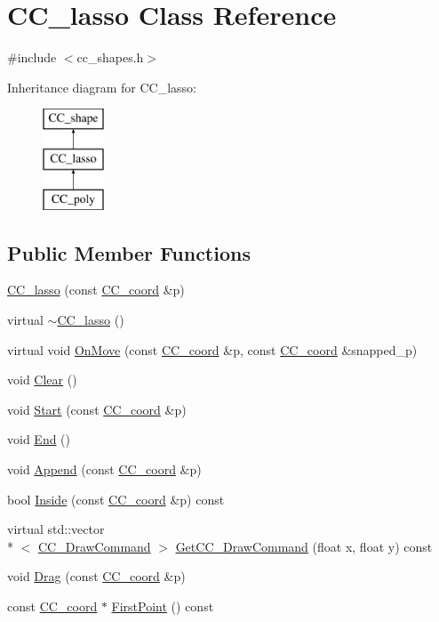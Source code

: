 \hypertarget{a00033}{\section{C\-C\-\_\-lasso Class Reference}
\label{a00033}
}


{\ttfamily \#include $<$cc\-\_\-shapes.\-h$>$}

Inheritance diagram for C\-C\-\_\-lasso\-:\begin{figure}[H]
\begin{center}
\leavevmode
\includegraphics[height=3.000000cm]{a00033}
\end{center}
\end{figure}
\subsection*{Public Member Functions}
\begin{DoxyCompactItemize}
\item 
\hyperlink{a00033_a52c0140bc457076fd9d0126d3dc1c8ad}{C\-C\-\_\-lasso} (const \hyperlink{a00029}{C\-C\-\_\-coord} \&p)
\item 
virtual \hyperlink{a00033_a20774b6bda8264fe9e229a0bbf9854f7}{$\sim$\-C\-C\-\_\-lasso} ()
\item 
virtual void \hyperlink{a00033_ae5572606390286f5b6a2f137aee93dc9}{On\-Move} (const \hyperlink{a00029}{C\-C\-\_\-coord} \&p, const \hyperlink{a00029}{C\-C\-\_\-coord} \&snapped\-\_\-p)
\item 
void \hyperlink{a00033_afe2140061e67412e38f86c13226c33b5}{Clear} ()
\item 
void \hyperlink{a00033_a69c7a48f5b32a35407dafdcabd62cc1d}{Start} (const \hyperlink{a00029}{C\-C\-\_\-coord} \&p)
\item 
void \hyperlink{a00033_a86d2e800ef81566eb90d9d5819d7bcde}{End} ()
\item 
void \hyperlink{a00033_a8d6269272f544d58e85deb5fee9f04f4}{Append} (const \hyperlink{a00029}{C\-C\-\_\-coord} \&p)
\item 
bool \hyperlink{a00033_a6cdc0697c525220754dd53777587ea72}{Inside} (const \hyperlink{a00029}{C\-C\-\_\-coord} \&p) const 
\item 
virtual std\-::vector\\*
$<$ \hyperlink{a00031}{C\-C\-\_\-\-Draw\-Command} $>$ \hyperlink{a00033_afa75847821de1281822ec0ca1521e7f5}{Get\-C\-C\-\_\-\-Draw\-Command} (float x, float y) const 
\item 
void \hyperlink{a00033_ac36fdd2ff053803544c32ee860690d77}{Drag} (const \hyperlink{a00029}{C\-C\-\_\-coord} \&p)
\item 
const \hyperlink{a00029}{C\-C\-\_\-coord} $\ast$ \hyperlink{a00033_a7fc031e0de063742c0537052f395cc29}{First\-Point} () const 
\end{DoxyCompactItemize}
